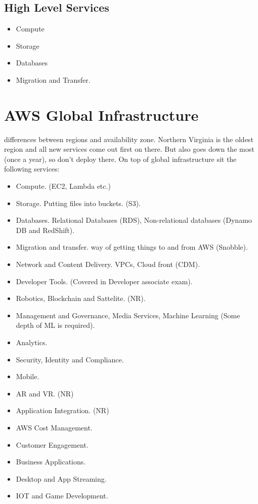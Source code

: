 \subsection{High Level Services}
\begin{itemize}
	\item Compute
	\item Storage	
	\item Databases
	\item Migration and Transfer.
\end{itemize}

\section{AWS Global Infrastructure}
differences between regions and availability zone. Northern Virginia is the oldest region and all new services come out first on there. But also goes down the most (once a year), so don't deploy there. On top of global infrastructure sit the following services:
\begin{itemize}
	\item Compute. (EC2, Lambda etc.)
	\item Storage. Putting files into buckets. (S3).
	\item Databases. Relational Databases (RDS), Non-relational databases (Dynamo DB and RedShift).
	\item Migration and transfer. way of getting things to and from AWS (Snobble).
	\item Network and Content Delivery. VPCs, Cloud front (CDM).
	\item Developer Tools. (Covered in Developer associate exam).
	\item Robotics, Blockchain and Sattelite. (NR).
	\item Management and Governance, Media Services, Machine Learning (Some depth of ML is required). 
	\item Analytics.
	\item Security, Identity and Compliance.
	\item Mobile.
	\item AR and VR. (NR)
	\item Application Integration. (NR)
	\item AWS Cost Management.
	\item Customer Engagement.
	\item Business Applications.
	\item Desktop and App Streaming.
	\item IOT and Game Development.
\end{itemize}

